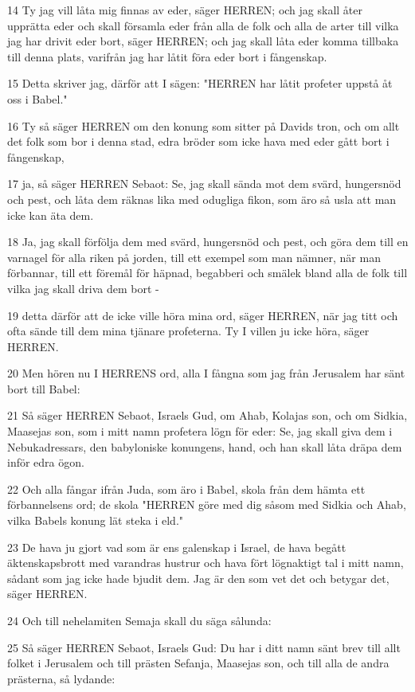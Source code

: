 \par 14 Ty jag vill låta mig finnas av eder, säger HERREN; och jag skall åter upprätta eder och skall församla eder från alla de folk och alla de arter till vilka jag har drivit eder bort, säger HERREN; och jag skall låta eder komma tillbaka till denna plats, varifrån jag har låtit föra eder bort i fångenskap.
\par 15 Detta skriver jag, därför att I sägen: "HERREN har låtit profeter uppstå åt oss i Babel."
\par 16 Ty så säger HERREN om den konung som sitter på Davids tron, och om allt det folk som bor i denna stad, edra bröder som icke hava med eder gått bort i fångenskap,
\par 17 ja, så säger HERREN Sebaot: Se, jag skall sända mot dem svärd, hungersnöd och pest, och låta dem räknas lika med odugliga fikon, som äro så usla att man icke kan äta dem.
\par 18 Ja, jag skall förfölja dem med svärd, hungersnöd och pest, och göra dem till en varnagel för alla riken på jorden, till ett exempel som man nämner, när man förbannar, till ett föremål för häpnad, begabberi och smälek bland alla de folk till vilka jag skall driva dem bort -
\par 19 detta därför att de icke ville höra mina ord, säger HERREN, när jag titt och ofta sände till dem mina tjänare profeterna. Ty I villen ju icke höra, säger HERREN.
\par 20 Men hören nu I HERRENS ord, alla I fångna som jag från Jerusalem har sänt bort till Babel:
\par 21 Så säger HERREN Sebaot, Israels Gud, om Ahab, Kolajas son, och om Sidkia, Maasejas son, som i mitt namn profetera lögn för eder: Se, jag skall giva dem i Nebukadressars, den babyloniske konungens, hand, och han skall låta dräpa dem inför edra ögon.
\par 22 Och alla fångar ifrån Juda, som äro i Babel, skola från dem hämta ett förbannelsens ord; de skola "HERREN göre med dig såsom med Sidkia och Ahab, vilka Babels konung lät steka i eld."
\par 23 De hava ju gjort vad som är ens galenskap i Israel, de hava begått äktenskapsbrott med varandras hustrur och hava fört lögnaktigt tal i mitt namn, sådant som jag icke hade bjudit dem. Jag är den som vet det och betygar det, säger HERREN.
\par 24 Och till nehelamiten Semaja skall du säga sålunda:
\par 25 Så säger HERREN Sebaot, Israels Gud: Du har i ditt namn sänt brev till allt folket i Jerusalem och till prästen Sefanja, Maasejas son, och till alla de andra prästerna, så lydande:
